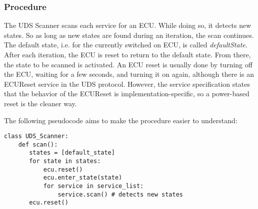 \subsubsection{Procedure}

The UDS Scanner scans each service for an ECU. While doing so, it detects new states. So as long as new states are found during an iteration, the scan continues. The default state, i.e. for the currently switched on ECU, is called \emph{defaultState}. After each iteration, the ECU is reset to return to the default state. From there, the state to be scanned is activated. An ECU reset is usually done by turning off the ECU, waiting for a few seconds, and turning it on again, although there is an ECUReset service in the UDS protocol. However, the service specification states that the behavior of the ECUReset is implementation-specific, so a power-based reset is the cleaner way.

The following pseudocode aims to make the procedure easier to understand:

\begin{samepage}
\begin{verbatim}
class UDS_Scanner:
    def scan():
       states = [default_state]
       for state in states:
           ecu.reset()
           ecu.enter_state(state)
           for service in service_list:
               service.scan() # detects new states
       ecu.reset()
\end{verbatim}
\end{samepage}
